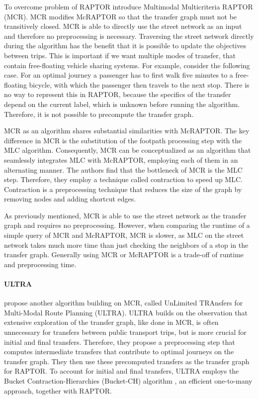 To overcome problem of RAPTOR  introduce Multimodal Multicriteria RAPTOR (MCR).
MCR modifies McRAPTOR so that the transfer graph must not be transitively closed.
MCR is able to directly use the street network as an input and therefore no preprocessing is necessary.
Traversing the street network directly during the algorithm has the benefit that it is possible to update the objectives between trips.
This is important if we want multiple modes of transfer, that contain free-floating vehicle sharing systems.
For example, consider the following case.
For an optimal journey a passenger has to first walk five minutes to a free-floating bicycle, with which the passenger then travels to the next stop.
There is no way to represent this in RAPTOR, because the specifics of the transfer depend on the current label, which is unknown before running the algorithm.
Therefore, it is not possible to precompute the transfer graph.

MCR as an algorithm shares substantial similarities with McRAPTOR.
The key difference in MCR is the substitution of the footpath processing step with the MLC algorithm.
Consequently, MCR can be conceptualized as an algorithm that seamlessly integrates MLC with McRAPTOR, employing each of them in an alternating manner.
The authors find that the bottleneck of MCR is the MLC step.
Therefore, they employ a technique called contraction  to speed up MLC.
Contraction is a preprocessing technique that reduces the size of the graph by removing nodes and adding shortcut edges.

As previously mentioned, MCR is able to use the street network as the transfer graph and requires no preprocessing.
However, when comparing the runtime of a simple query of MCR and McRAPTOR, MCR is slower, as MLC on the street network takes much more time than just checking the neighbors of a stop in the transfer graph.
Generally using MCR or McRAPTOR is a trade-off of runtime and preprocessing time.


\paragraph{ULTRA}
\label{subsubsec:ultra}

 propose another algorithm building on MCR, called UnLimited TRAnsfers for Multi-Modal Route Planning (ULTRA).
ULTRA builds on the observation that extensive exploration of the transfer graph, like done in MCR, is often unnecessary for transfers between public transport trips, but is more crucial for initial and final transfers.
Therefore, they propose a preprocessing step that computes intermediate transfers that contribute to optimal journeys on the transfer graph.
They then use these precomputed transfers as the transfer graph for RAPTOR.
To account for initial and final transfers, ULTRA employs the Bucket Contraction-Hierarchies (Bucket-CH) algorithm , an efficient one-to-many approach, together with RAPTOR.

